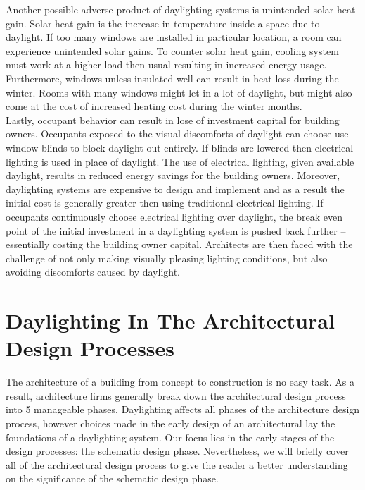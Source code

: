     Another possible adverse product of daylighting systems is unintended solar heat gain. Solar heat gain is the increase in temperature inside a space due to daylight. 
    If too many windows are installed in particular location, a room can experience unintended solar gains.
    To counter solar heat gain, cooling system must work at a higher load then usual resulting in increased energy usage.
    Furthermore, windows unless insulated well can result in heat loss during the winter.
    Rooms with many windows might let in a lot of daylight, but might also come at the cost of increased heating cost during the winter months.\\

    Lastly, occupant behavior can result in lose of investment capital for building owners.
    Occupants exposed to the visual discomforts of daylight can choose use window blinds to block daylight out entirely.
    If blinds are lowered then electrical lighting is used in place of daylight.
    The use of electrical lighting, given available daylight, results in reduced energy savings for the building owners.
    Moreover, daylighting systems are expensive to design and implement and as a result the initial cost is generally greater then using traditional electrical lighting.
    If occupants continuously choose electrical lighting over daylight, the break even point of the initial investment in a daylighting system is pushed back further -- essentially costing the building owner capital.
    Architects are then faced with the challenge of not only making visually pleasing lighting conditions, but also avoiding discomforts caused by daylight.

\section{Daylighting In The Architectural Design Processes}

  The architecture of a building from concept to construction is no easy task.
  As a result, architecture firms generally break down the architectural design process into 5 manageable phases\cite{TODO}.
  Daylighting affects all phases of the architecture design process, however choices made in the early design of an architectural lay the foundations of a daylighting system.
  Our focus lies in the early stages of the design processes: the schematic design phase.
  Nevertheless, we will briefly cover all of the architectural design process to give the reader a better understanding on the significance of the schematic design phase.

